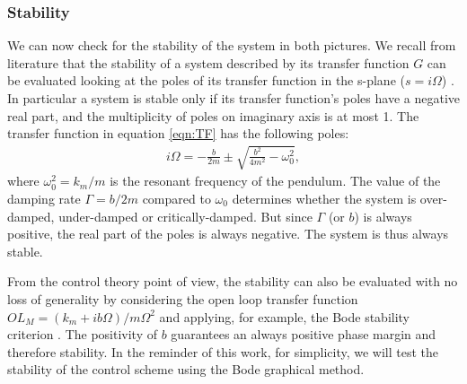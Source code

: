\subsubsection*{Stability}
We can now check for the stability of the system in both pictures.
We recall from literature that the stability of a system described by its transfer function $G$ can be evaluated looking at the poles 
of its transfer function in the s-plane ($s=i\Omega$) \cite{Greensite70}. In particular a system is stable only if its transfer function's poles have
a negative real part,  and the multiplicity of poles on imaginary axis is at most 1.
The transfer function in equation \ref{eqn:TF} has the following poles:
\begin{eqnarray}
\label{eqn:poles}
i\Omega=-\frac{b}{2m}\pm\sqrt{\frac{b^2}{4m^2}-\omega_0^2},
\end{eqnarray}
where $\omega_0^2=k_m/m$ is the resonant frequency of the pendulum. 
The value of the damping rate $\Gamma=b/2m$ compared to $\omega_0$ determines whether the system is over-damped, under-damped or critically-damped. But since  $\Gamma$ (or $b$) is always positive, 
the real part of the poles is always negative. The system is thus always stable. 

From the control theory point of view, the stability can also be evaluated with no loss of generality by considering the open loop transfer function $OL_M= (k_m+ib\Omega)/m\Omega^2$ and applying, for example, the Bode stability criterion \cite{Franklin94}. The positivity of $b$ guarantees an always positive phase margin and therefore stability.
In the reminder of this work, for simplicity, we will test the stability of the control scheme using the Bode graphical method.

